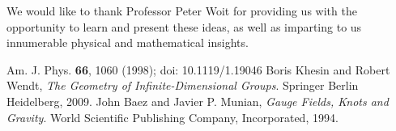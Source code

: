 \documentclass[12pt]{article}
\begin{document}
We would like to thank Professor Peter Woit for providing us with the opportunity to learn and present these ideas, as well as imparting to us innumerable physical and mathematical insights.  


\begin{thebibliography}{5}

	Am. J. Phys. \textbf{66}, 1060 (1998); doi: 10.1119/1.19046
	Boris Khesin and Robert Wendt, \emph{The Geometry of Infinite-Dimensional Groups}.
    Springer Berlin Heidelberg, 2009.
	John Baez and Javier P. Munian, \emph{Gauge Fields, Knots and Gravity}.
    World Scientific Publishing Company, Incorporated, 1994.

\end{thebibliography}
\end{document}
